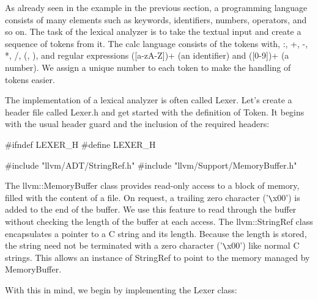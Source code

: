 As already seen in the example in the previous section, a programming language consists of many elements such as keywords, identifiers, numbers, operators, and so on. The task of the lexical analyzer is to take the textual input and create a sequence of tokens from it. The calc language consists of the tokens with, :, +, -, *, /, (, ), and regular expressions ([a-zA-Z])+ (an identifier) and ([0-9])+ (a number). We assign a unique number to each token to make the handling of tokens easier.


The implementation of a lexical analyzer is often called Lexer. Let’s create a header file called Lexer.h and get started with the definition of Token. It begins with the usual header guard and the inclusion of the required headers:

\begin{cpp}
#ifndef LEXER_H
#define LEXER_H

#include "llvm/ADT/StringRef.h"
#include "llvm/Support/MemoryBuffer.h"
\end{cpp}

The llvm::MemoryBuffer class provides read-only access to a block of memory, filled with the content of a file. On request, a trailing zero character ('\verb|\|x00') is added to the end of the buffer. We use this feature to read through the buffer without checking the length of the buffer at each access. The llvm::StringRef class encapsulates a pointer to a C string and its length. Because the length is stored, the string need not be terminated with a zero character ('\verb|\|x00') like normal C strings. This allows an instance of StringRef to point to the memory managed by MemoryBuffer.

With this in mind, we begin by implementing the Lexer class:

